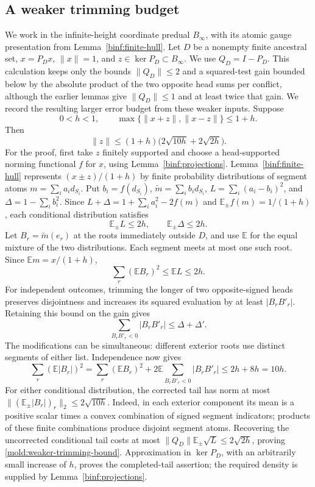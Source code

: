 \subsection{A weaker trimming budget}
\label{mold:weaker-trimming}
We work in the infinite-height coordinate predual \(B_\infty\), with
its atomic gauge presentation from Lemma~\ref{binf:finite-hull}.
Let \(D\) be a nonempty finite ancestral set, \(x=P_Dx\),
\(\|x\|=1\), and \(z\in\ker P_D\subset B_\infty\).  We use
\(Q_D=I-P_D\). This calculation keeps only the bounds
$\|Q_D\|\le2$ and a squared-test gain bounded below by the absolute product
of the two opposite head sums per conflict, although the earlier
lemmas give $\|Q_D\|\le1$ and at least twice that gain.
We record the resulting larger error budget from these
weaker inputs. Suppose
\[
 0<h<1,\qquad \max\{\|x+z\|,\|x-z\|\}\le1+h.
\]
Then
\begin{equation}\label{mold:weaker-trimming-bound}
 \|z\|\le(1+h)\bigl(2\sqrt{10h}+2\sqrt{2h}\bigr).
\end{equation}
For the proof, first take \(z\) finitely supported and choose a head-supported
norming functional \(f\) for \(x\), using
Lemma~\ref{binf:projections}.  Lemma~\ref{binf:finite-hull} represents
\((x\pm z)/(1+h)\) by finite probability distributions of segment atoms \(m=\sum_i a_i d_{S_i}\).
Put \(b_i=f(d_{S_i})\), \(\widetilde m=\sum_i b_i d_{S_i}\),
\(L=\sum_i(a_i-b_i)^2\), and \(\Delta=1-\sum_i b_i^2\).
Since \(L+\Delta=1+\sum_i a_i^2-2f(m)\) and
\(\mathbb E_\pm f(m)=1/(1+h)\), each conditional distribution satisfies
\[
 \mathbb E_\pm L\le2h,\qquad \mathbb E_\pm\Delta\le2h.
\]
Let \(B_r=\widetilde m(e_r)\) at the roots immediately outside \(D\), and use
\(\mathbb E\) for the equal mixture of the two distributions.  Each segment
meets at most one such root.  Since \(\mathbb E m=x/(1+h)\),
\[
 \sum_r(\mathbb E B_r)^2\le\mathbb E L\le2h.
\]
For independent outcomes, trimming the longer of two opposite-signed heads
preserves disjointness and increases its squared evaluation by at least
\(|B_rB'_r|\).  Retaining this bound on the gain gives
\[
 \sum_{B_rB'_r<0}|B_rB'_r|\le\Delta+\Delta'.
\]
The modifications can be simultaneous: different exterior roots use distinct
segments of either list.  Independence now gives
\[
 \sum_r(\mathbb E|B_r|)^2
 =\sum_r(\mathbb E B_r)^2+
       2\mathbb E\sum_{B_rB'_r<0}|B_rB'_r|
 \le2h+8h=10h.
\]
For either conditional distribution, the corrected tail has norm at most
\(\| (\mathbb E_\pm |B_r|)_r\|_2\le2\sqrt{10h}\).
Indeed, in each exterior component its mean is a positive scalar times a
convex combination of signed segment indicators; products of these finite
combinations produce disjoint segment atoms.  Recovering the uncorrected
conditional tail costs at most
\(\|Q_D\|\mathbb E_\pm\sqrt L\le2\sqrt{2h}\), proving
\eqref{mold:weaker-trimming-bound}.  Approximation in \(\ker P_D\), with an
arbitrarily small increase of \(h\), proves the completed-tail assertion;
the required density is supplied by Lemma~\ref{binf:projections}.

